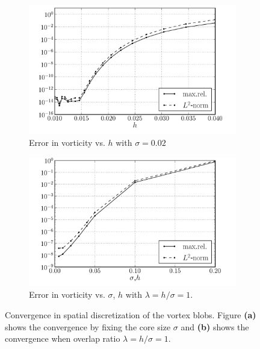 	\begin{figure}[!b]
	        \centering
	        \begin{subfigure}[b]{0.47\textwidth}
	                \includegraphics[width=\textwidth]{figures/lagrangian/lambOseen_convergence_dx_sigma0p02_compressed.pdf}
	                \caption{Error in vorticity vs. $h$ with $\sigma = 0.02$}
	                \label{fig:lambOseen_convergence_dx_sigma0p02_compressed}
	        \end{subfigure}%
	        \qquad %
	        \begin{subfigure}[b]{0.47\textwidth}
	                \includegraphics[width=\textwidth]{figures/lagrangian/lambOseen_convergence_dx_compressed.pdf}
	                \caption{Error in vorticity vs. $\sigma$, $h$ with $\lambda=h/\sigma=1$.}
	                \label{fig:lambOseen_convergence_dx_compressed}
	        \end{subfigure}
	        \caption{Convergence in spatial discretization of the vortex blobs. Figure \textbf{(a)} shows the convergence by fixing the core size $\sigma$ and \textbf{(b)} shows the convergence when overlap ratio $\lambda = h/\sigma = 1$.}
	        \label{fig:lambOseen_convergence_dx}
	\end{figure}

